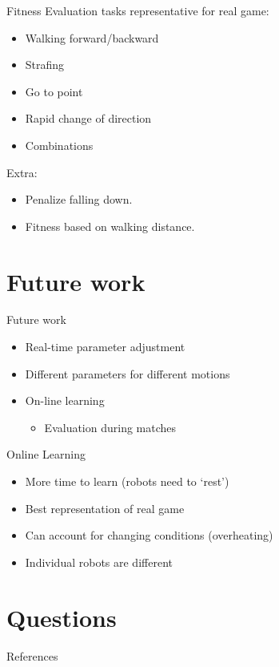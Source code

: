 \documentclass{beamer}
\begin{document}
\begin{frame}{Fitness}
    Evaluation tasks representative for real game:
    \begin{itemize}
        \item Walking forward/backward
		\item Strafing
	    \item Go to point
		\item Rapid change of direction
		\item Combinations
    \end{itemize}

    Extra:
    \begin{itemize}
    \item Penalize falling down.    
    \item Fitness based on walking distance.
    \end{itemize}
\end{frame}

\section{Future work}
\begin{frame}{Future work}
\begin{itemize}
\item Real-time parameter adjustment
\item Different parameters for different motions
\item On-line learning
	\begin{itemize}
		\item Evaluation during matches
	\end{itemize}
\end{itemize}
\end{frame}

\begin{frame}{Online Learning}
\begin{itemize}
\item More time to learn (robots need to `rest')
\item Best representation of real game
\item Can account for changing conditions (overheating)
\item Individual robots are different
\end{itemize}
\end{frame}

\section{Questions}

\begin{frame}{References}
	
	
\end{frame}
\end{document}
